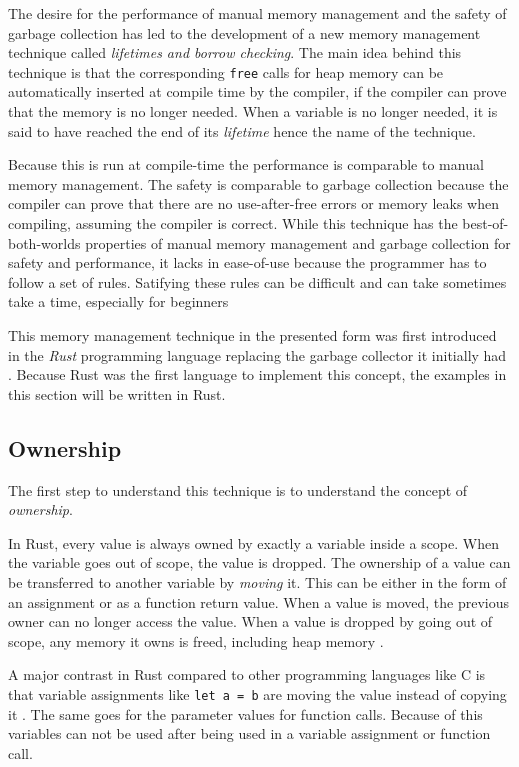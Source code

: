 The desire for the performance of manual memory management and the safety of garbage collection has led to the development
of a new memory management technique called \textit{lifetimes and borrow checking}.
The main idea behind this technique is that the corresponding \texttt{free} calls for heap memory can be automatically inserted
at compile time by the compiler, if the compiler can prove that the memory is no longer needed.
When a variable is no longer needed, it is said to have reached the end of its \textit{lifetime} hence the name of the technique.

Because this is run at compile-time the performance is comparable to manual memory management.
The safety is comparable to garbage collection because the compiler can prove that there are no use-after-free errors
or memory leaks when compiling, assuming the compiler is correct.
While this technique has the best-of-both-worlds properties of manual memory management and garbage collection
for safety and performance, it lacks in ease-of-use because the programmer has to follow a set of rules.
Satifying these rules can be difficult and can take sometimes take a time, especially for beginners \cite{rust_usability}

This memory management technique in the presented form was first introduced in the \textit{Rust} programming language
\cite[1. Introduction]{rust_borrow_formalism_2021} replacing the garbage collector it initially had \cite{rust_gc_removal}.
Because Rust was the first language to implement this concept, the examples in this section will be written in Rust.

\subsection{Ownership}

The first step to understand this technique is to understand the concept of \textit{ownership}.

In Rust, every value is always owned by exactly a variable inside a scope.
When the variable goes out of scope, the value is dropped.
The ownership of a value can be transferred to another variable by \textit{moving} it.
This can be either in the form of an assignment or as a function return value.
When a value is moved, the previous owner can no longer access the value.
When a value is dropped by going out of scope, any memory it owns is freed, including heap memory \cite[59-61]{rust_book_2019}.

A major contrast in Rust compared to other programming languages like C
is that variable assignments like \texttt{let a = b} are moving the value
instead of copying it \cite[2.2 Ownership]{rust_borrow_formalism_2021}. The same goes for the parameter values for function calls.
Because of this variables can not be used after being used in a variable assignment or function call.

